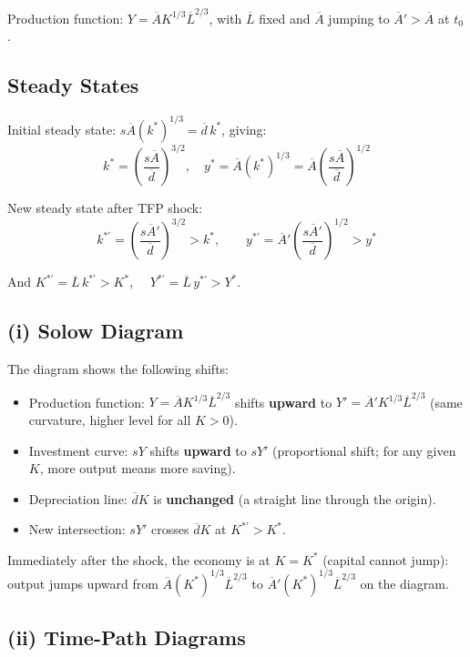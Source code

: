 \documentclass[letterpaper,12pt]{article}
\begin{document}
\noindent Production function: $Y = \overline{A}K^{1/3}\overline{L}^{2/3}$, with $\overline{L}$ fixed and $\overline{A}$ jumping to $\overline{A}' > \overline{A}$ at $t_0$.

\subsection*{Steady States}

Initial steady state: $s\overline{A}(k^*)^{1/3} = \overline{d}\,k^*$, giving:
\[
k^* = \!\left(\frac{s\overline{A}}{\overline{d}}\right)^{\!3/2}, \quad y^* = \overline{A}(k^*)^{1/3} = \overline{A}\!\left(\frac{s\overline{A}}{\overline{d}}\right)^{\!1/2}
\]

New steady state after TFP shock:
\[
k^{*\prime} = \!\left(\frac{s\overline{A}'}{\overline{d}}\right)^{\!3/2} > k^*, \qquad y^{*\prime} = \overline{A}'\!\left(\frac{s\overline{A}'}{\overline{d}}\right)^{\!1/2} > y^*
\]

And $K^{*\prime} = \overline{L}\,k^{*\prime} > K^*$, $\quad Y^{*\prime} = \overline{L}\,y^{*\prime} > Y^*$.

\subsection*{(i) Solow Diagram}

The diagram shows the following shifts:

\begin{itemize}
  \item Production function: $Y = \overline{A}K^{1/3}\overline{L}^{2/3}$ shifts \textbf{upward} to $Y' = \overline{A}'K^{1/3}\overline{L}^{2/3}$ (same curvature, higher level for all $K>0$).
  \item Investment curve: $sY$ shifts \textbf{upward} to $sY'$ (proportional shift; for any given $K$, more output means more saving).
  \item Depreciation line: $\overline{d}K$ is \textbf{unchanged} (a straight line through the origin).
  \item New intersection: $sY'$ crosses $\overline{d}K$ at $K^{*\prime} > K^*$.
\end{itemize}

Immediately after the shock, the economy is at $K = K^*$ (capital cannot jump): output jumps upward from $\overline{A}(K^*)^{1/3}\overline{L}^{2/3}$ to $\overline{A}'(K^*)^{1/3}\overline{L}^{2/3}$ on the diagram.

\subsection*{(ii) Time-Path Diagrams}
\end{document}
